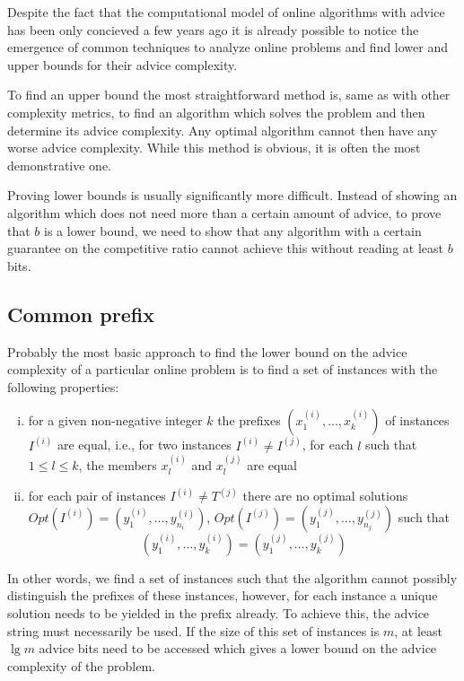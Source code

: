 
Despite the fact that the computational model of online algorithms with
advice has been only concieved a few years ago it is already possible to
notice the emergence of common techniques to analyze online problems and
find lower and upper bounds for their advice complexity.

To find an upper bound the most straightforward method is, same as with
other complexity metrics, to find an algorithm which solves the problem
and then determine its advice complexity. Any optimal algorithm cannot
then have any worse advice complexity. While this method is obvious, it is
often the most demonstrative one.

Proving lower bounds is usually significantly more difficult. Instead of
showing an algorithm which does not need more than a certain amount of
advice, to prove that $b$ is a lower bound, we need to show that any
algorithm with a certain guarantee on the competitive ratio cannot achieve
this without reading at least $b$ bits.

\subsection{Common prefix}

Probably the most basic approach to find the lower bound on the advice
complexity of a particular online problem is to find a set of instances
with the following properties:

\begin{enumerate}[(i)]
    \item
    for a given non-negative integer $k$ the prefixes $(x_1^{(i)}, \dots,
    x_k^{(i)})$ of instances $I^{(i)}$ are equal, i.e., for two instances
    $I^{(i)} \not= I^{(j)}$, for each $l$ such that $1 \leq l \leq k$,
    the members $x_l^{(i)}$ and $x_l^{(j)}$ are equal

    \item
    for each pair of instances $I^{(i)} \not= T^{(j)}$ there are no
    optimal solutions $Opt(I^{(i)}) = (y_1^{(i)}, \dots, y_{n_i}^{(i)})$,
    $Opt(I^{(j)}) = (y_1^{(j)}, \dots, y_{n_j}^{(j)})$ such that
    $$
        (y_1^{(i)}, \dots, y_{k}^{(i)}) = (y_1^{(j)}, \dots, y_{k}^{(j)})
    $$
\end{enumerate}

In other words, we find a set of instances such that the algorithm cannot
possibly distinguish the prefixes of these instances, however, for each
instance a unique solution needs to be yielded in the prefix already. To
achieve this, the advice string must necessarily be used. If the size of
this set of instances is $m$, at least $\lg m$ advice bits need to be
accessed which gives a lower bound on the advice complexity of the
problem.

